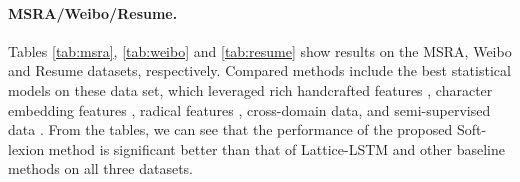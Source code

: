 \documentclass[11pt,a4paper]{article}
\begin{document}
\begin{CJK}{UTF8}{gbsn}
\begin{table}[t]
    \centering
    \caption{Performance on Resume.}
    \label{tab:resume}
\end{table}





\paragraph{MSRA/Weibo/Resume.} Tables \ref{tab:msra}, \ref{tab:weibo} and \ref{tab:resume} show results on the MSRA, Weibo and Resume datasets, respectively. Compared methods include the best statistical models on these data set, which leveraged rich handcrafted features \cite{chen2006chinese,zhang2006word,zhou2013chinese}, character embedding features \cite{lu2016multi, peng2016improving}, radical features \cite{dong2016character}, cross-domain data, and semi-supervised data \cite{he2017unified}. From the tables, we can see that the performance of the proposed Soft-lexion method is significant better than that of Lattice-LSTM and other baseline methods on all three datasets.




\end{CJK}
\end{document}
